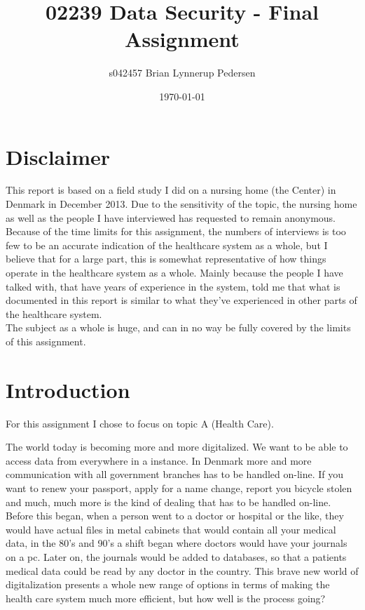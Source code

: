 \documentclass[11pt]{article}
\begin{document}
\title{02239 Data Security - Final Assignment}
\author{s042457 Brian Lynnerup Pedersen}
\date{\today}
\maketitle
\thispagestyle{empty}
\pagebreak
\tableofcontents
\pagebreak
\section{Disclaimer}
This report is based on a field study I did on a nursing home (the Center) in Denmark in December 2013. Due to the sensitivity of the topic, the nursing home as well as the people I have interviewed has requested to remain anonymous.
Because of the time limits for this assignment, the numbers of interviews is too few to be an accurate indication of the healthcare system as a whole, but I  believe that for a large part, this is somewhat representative of how things operate in the healthcare system as a whole. Mainly because the people I have talked with, that have years of experience in the system, told me that what is documented in this report is similar to what they've experienced in other parts of the healthcare system.\\
The subject as a whole is huge, and can in no way be fully covered by the limits of this assignment.
\pagebreak
\section{Introduction}
For this assignment I chose to focus on topic A (Health Care).

The world today is becoming more and more digitalized. We want to be able to access data  from everywhere in a instance. In Denmark more and more communication with all government branches has to be handled on-line. If you want to renew your passport, apply for a name change, report you bicycle stolen and much, much more is the kind of dealing that has to be handled on-line. Before this began, when a person went to a doctor or hospital or the like, they would have actual files in metal cabinets that would contain all your medical data, in the 80's and 90's a shift began where doctors would have your journals on a pc. Later on, the journals would be added to databases, so that a patients medical data could be read by any doctor in the country. This brave new world of digitalization presents a whole new range of options in terms of making the health care system much more efficient, but how well is the process going?
\end{document}

